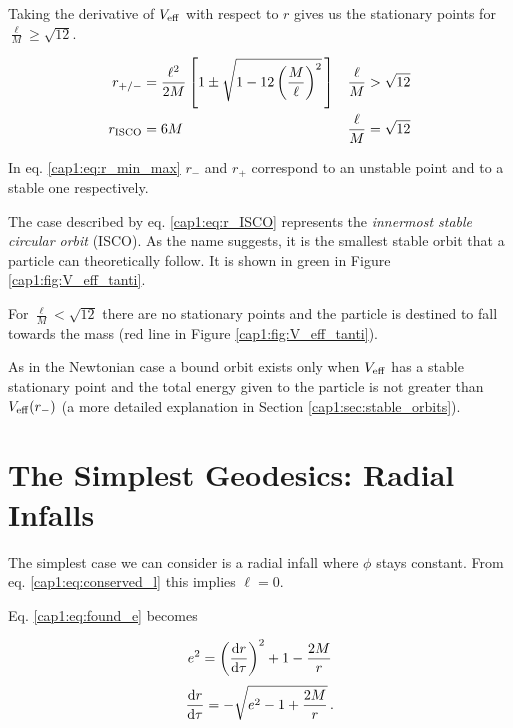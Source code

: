 Taking the derivative of $V_{\rm eff}$ with respect to $r$ gives us the
stationary points for $\frac{\ell}{M} \geq \sqrt{12}$.

\begin{subequations}
\begin{align}
    r_{+ / -} &= \frac{\ell^2}{2 M} \left[1 \pm
    \sqrt{1 - 12 \left( \frac{M}{\ell} \right)^2} \, \right]
    &&\frac{\ell}{M} > \sqrt{12} \label{cap1:eq:r_min_max} \\
    r_{\rm ISCO} &= 6 M
    &&\frac{\ell}{M} = \sqrt{12} \label{cap1:eq:r_ISCO}
\end{align}
\label{cap1:eq:stationary_r}
\end{subequations}

In eq. \ref{cap1:eq:r_min_max} $r_-$ and $r_+$ correspond
to an unstable point and to a stable one respectively.

The case described by eq. \ref{cap1:eq:r_ISCO} represents the
\textit{innermost stable circular orbit} (ISCO).
As the name suggests, it is the smallest stable orbit that a particle can
theoretically follow.
It is shown in green in Figure \ref{cap1:fig:V_eff_tanti}.

For $\frac{\ell}{M} < \sqrt{12}$ there are no stationary points and the particle
is destined to fall towards the mass (red line in Figure
\ref{cap1:fig:V_eff_tanti}).

As in the Newtonian case a bound orbit exists only when $V_{\rm eff}$ has a
stable stationary point and the total energy given to the particle is not
greater than $V_{\rm eff}(r_-)$ (a more detailed explanation in
Section \ref{cap1:sec:stable_orbits}).

\newpage


\section{The Simplest Geodesics: Radial Infalls}

The simplest case we can consider is a radial infall where $\phi$ stays
constant.
From eq. \ref{cap1:eq:conserved_l} this implies $\ell = 0$.

Eq. \ref{cap1:eq:found_e} becomes


\begin{equation*}
    e^2 = \left(\dv{r}{\tau}\right)^2 + 1 - \frac{2M}{r}
\end{equation*}
\begin{equation}
    \dv{r}{\tau} = - \sqrt{e^2 - 1 + \frac{2 M}{r}} \, .
    \label{cap1:eq:radial_infall_ODE_1}
\end{equation}

